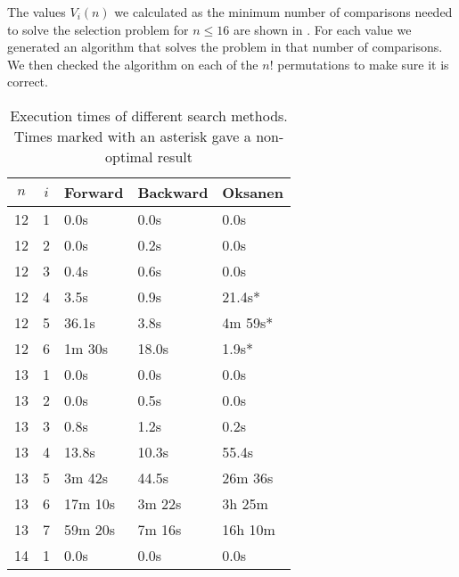 \documentclass[twoside,leqno,twocolumn]{article}
\begin{document}
The values $V_i(n)$ we calculated as the minimum number of comparisons needed to solve the selection problem for $n \leq 16$ are shown in .
For each value we generated an algorithm that solves the problem in that number of comparisons.
We then checked the algorithm on each of the $n!$ permutations to make sure it is correct.

\begin{table}[!t]
  \renewcommand{\arraystretch}{1.2}
  \caption{Execution times of different search methods. Times marked with an asterisk gave a non-optimal result }
  \label{table:search_algorithms}
  \centering
  \begin{tabular}{c|c|l|l|l}
    $n$ & $i$ & \textbf{Forward} & \textbf{Backward} & \textbf{Oksanen} \\
    \hline
    12  & 1   & 0.0s             & 0.0s              & 0.0s             \\
    12  & 2   & 0.0s             & 0.2s              & 0.0s             \\
    12  & 3   & 0.4s             & 0.6s              & 0.0s             \\
    12  & 4   & 3.5s             & 0.9s              & 21.4s*           \\
    12  & 5   & 36.1s            & 3.8s              & 4m 59s*          \\
    12  & 6   & 1m 30s           & 18.0s             & 1.9s*            \\
    \hline
    13  & 1   & 0.0s             & 0.0s              & 0.0s             \\
    13  & 2   & 0.0s             & 0.5s              & 0.0s             \\
    13  & 3   & 0.8s             & 1.2s              & 0.2s             \\
    13  & 4   & 13.8s            & 10.3s             & 55.4s            \\
    13  & 5   & 3m 42s           & 44.5s             & 26m 36s          \\
    13  & 6   & 17m 10s          & 3m 22s            & 3h 25m           \\
    13  & 7   & 59m 20s          & 7m 16s            & 16h 10m          \\
    \hline
    14  & 1   & 0.0s             & 0.0s              & 0.0s             \\

\end{tabular}
\end{table}
\end{document}
